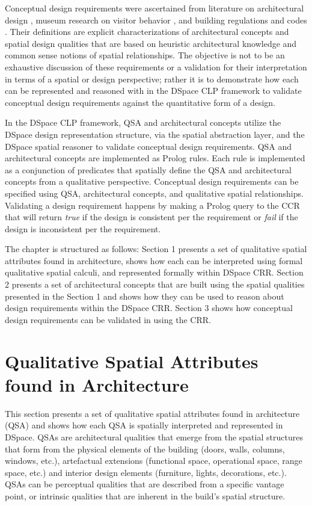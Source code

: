 \documentclass[12pt]{ucthesis}
\begin{document}
Conceptual design requirements were ascertained from literature on architectural design \cite{tbd}, museum research on visitor behavior \cite{tbd}, and building regulations and codes \cite{tbd}. Their definitions are explicit characterizations of architectural concepts and spatial design qualities that are based on heuristic architectural knowledge and common sense notions of spatial relationships. The objective is not to be an exhaustive discussion of these requirements or a validation for their interpretation in terms of a spatial or design perspective; rather it is to demonstrate how each can be represented and reasoned with in the DSpace CLP framework to validate conceptual design requirements against the quantitative form of a design. 

In the DSpace CLP framework, QSA and architectural concepts utilize the DSpace design representation structure, via the spatial abstraction layer, and the DSpace spatial reasoner to validate conceptual design requirements. QSA and architectural concepts are implemented as Prolog rules. Each rule is implemented as a conjunction of predicates that spatially define the QSA and architectural concepts from a qualitative perspective. Conceptual design requirements can be specified using QSA, architectural concepts, and qualitative spatial relationships. Validating a design requirement happens by making a Prolog query to the CCR that will return \emph{true} if the design is consistent per the requirement or \emph{fail} if the design is inconsistent per the requirement. 

The chapter is structured as follows: Section 1 presents a set of qualitative spatial attributes found in architecture, shows how each can be interpreted using formal qualitative spatial calculi, and represented formally within DSpace CRR. Section 2 presents a set of architectural concepts that are built using the spatial qualities presented in the Section 1 and shows how they can be used to reason about design requirements within the DSpace CRR. Section 3 shows how conceptual design requirements can be validated in using the CRR.


\section{Qualitative Spatial Attributes found in Architecture}
This section presents a set of qualitative spatial attributes found in architecture (QSA) and shows how each QSA is spatially interpreted and represented in DSpace. QSAs are architectural qualities that emerge from the spatial structures that form from the physical elements of the building (doors, walls, columns, windows, etc.), artefactual extensions (functional space, operational space, range space, etc.) and interior design elements (furniture, lights, decorations, etc.). QSAs can be perceptual qualities that are described from a specific vantage point, or intrinsic qualities that are inherent in the build's spatial structure. 
\end{document}
